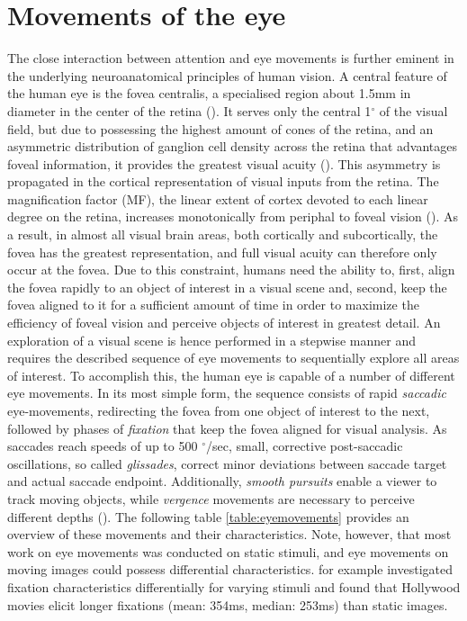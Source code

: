 \documentclass[a4paper, 12pt]{scrreprt}
\begin{document}
\section{Movements of the eye}\label{section:eyemoves}
The close interaction between attention and eye movements is further eminent in the underlying neuroanatomical principles of human vision. A central feature of the human eye is the fovea centralis, a specialised region about 1.5mm in diameter in the center of the retina (\cite{benninghof2004anat}). It serves only the central 1$^\circ$ of the visual field, but due to possessing the highest amount of cones of the retina, and an asymmetric distribution of ganglion cell density across the retina that advantages foveal information, it provides the greatest visual acuity (\cite{perry1986ganglion}). This asymmetry is propagated in the cortical representation of visual inputs from the retina. The magnification factor (MF), the linear extent of cortex devoted to each linear degree on the retina, increases monotonically from periphal to foveal vision (\cite{daniel1961representation}). As a result, in almost all visual brain areas, both cortically and subcortically, the fovea has the greatest representation, and full visual acuity can therefore only occur at the fovea. 
Due to this constraint, humans need the ability to, first, align the fovea rapidly to an object of interest in a visual scene and, second, keep the fovea aligned to it for a sufficient amount of time in order to maximize the efficiency of foveal vision and perceive objects of interest in greatest detail. An exploration of a visual scene is hence performed in a stepwise manner and requires the described sequence of eye movements to sequentially explore all areas of interest. To accomplish this, the human eye is capable of a number of different eye movements. In its most simple form, the sequence consists of rapid \textit{saccadic} eye-movements, redirecting the fovea from one object of interest to the next, followed by phases of \textit{fixation} that keep the fovea aligned for visual analysis. As saccades reach speeds of up to 500 $^\circ$/sec, small, corrective post-saccadic oscillations, so called \textit{glissades}, correct minor deviations between saccade target and actual saccade endpoint. Additionally, \textit{smooth pursuits} enable a viewer to track moving objects, while \textit{vergence} movements are necessary to perceive different depths (\cite{holmqvist2011eye}). The following table \ref{table:eyemovements} provides an overview of these movements and their characteristics. Note, however, that most work on eye movements was conducted on static stimuli, and eye movements on moving images could possess differential characteristics. \textcite{dorr2010variability} for example investigated fixation characteristics differentially for varying stimuli and found that Hollywood movies elicit longer fixations (mean: 354ms, median: 253ms) than static images. \newline
  
\end{document}

